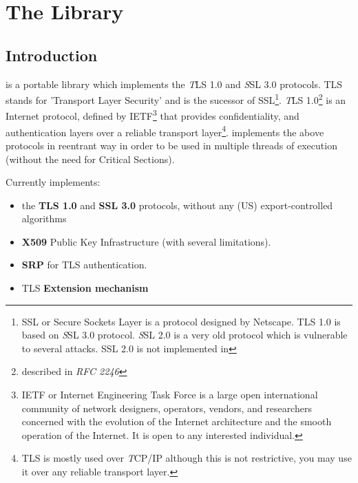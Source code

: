 \documentclass{book}
\begin{document}




\tableofcontents
\newpage
{}
\pagestyle{fancy}

\chapter{The Library}
\section{Introduction}
\par
\gnutls is a portable library which implements the {\emph TLS 1.0} and 
{\emph SSL 3.0} protocols.
TLS stands for 'Transport Layer Security' and is the sucessor of SSL\footnote{
SSL or Secure Sockets Layer is a protocol designed by Netscape. TLS 1.0 is based on
{\emph SSL 3.0} protocol. {\emph SSL 2.0} is a very old protocol which is vulnerable 
to several attacks. SSL 2.0 is not implemented in \gnutls}.
{\emph TLS 1.0}\footnote{described in {\it RFC 2246}} is an Internet protocol,
defined by IETF\footnote{IETF or Internet Engineering Task Force 
is a large open international community of network
designers, operators, vendors, and researchers concerned with the evolution of 
the Internet architecture and the smooth operation of the Internet. It is open to any interested individual.}
that provides confidentiality, and authentication layers over a {reliable
transport layer}\footnote{TLS is mostly used over {\emph TCP/IP} although this is not restrictive, you may
use it over any reliable transport layer.}. \gnutls implements the
above protocols in reentrant way in order to be used in multiple threads of 
execution (without the need for Critical Sections).

\par
Currently \gnutls implements:
\begin{itemize}
 \item the {\bf TLS 1.0} and {\bf{ SSL 3.0}} protocols, without any (US) export-controlled algorithms
 \item {\bf X509} Public Key Infrastructure (with several limitations).
 \item {\bf SRP} for TLS authentication.
 \item TLS {\bf Extension mechanism}
\end{itemize}
\end{document}
